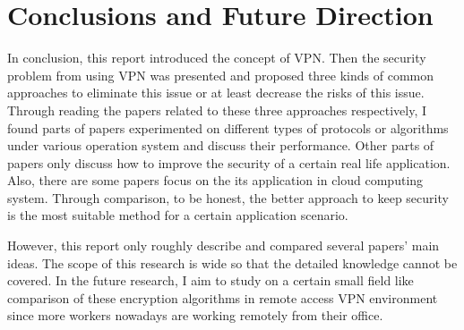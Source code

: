 \documentclass[12pt]{article} %
\begin{document}
\section{Conclusions and Future Direction}
In conclusion, this report introduced the concept of VPN. Then the security problem from using VPN was presented and proposed three kinds of common approaches to eliminate this issue or at least decrease the risks of this issue. Through reading the papers related to these three approaches respectively, I found parts of papers experimented on different types of protocols or algorithms under various operation system and discuss their performance. Other parts of papers only discuss how to improve the security of a certain real life application. Also, there are some papers focus on the its application in cloud computing system. Through comparison, to be honest, the better approach to keep security is the most suitable method for a certain application scenario.

However, this report only roughly describe and compared several papers’ main ideas. The scope of this research is wide so that the detailed knowledge cannot be covered. In the future research, I aim to study on a certain small field like comparison of these encryption algorithms in remote access VPN environment since more workers nowadays are working remotely from their office.
\nocite{*}


\end{document}

